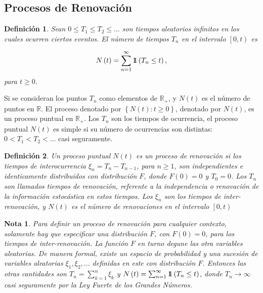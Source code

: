 \documentclass{article}
\newtheorem{Def}{Definición}
\newtheorem{Note}{Nota}
\newcommand{\rea}{\mathbb{R}}
\newcommand{\indora}{\mbox{$1$\hspace{-0.8ex}$1$}}
\begin{document}
\subsection{Procesos de Renovaci\'on}

\begin{Def}\label{Def.Tn}
Sean $0\leq T_{1}\leq T_{2}\leq \ldots$ son tiempos aleatorios infinitos en los cuales ocurren ciertos eventos. El n\'umero de tiempos $T_{n}$ en el intervalo $\left[0,t\right)$ es

\begin{eqnarray}
N\left(t\right)=\sum_{n=1}^{\infty}\indora\left(T_{n}\leq t\right),
\end{eqnarray}
para $t\geq0$.
\end{Def}

Si se consideran los puntos $T_{n}$ como elementos de $\rea_{+}$, y $N\left(t\right)$ es el n\'umero de puntos en $\rea$. El proceso denotado por $\left\{N\left(t\right):t\geq0\right\}$, denotado por $N\left(t\right)$, es un proceso puntual en $\rea_{+}$. Los $T_{n}$ son los tiempos de ocurrencia, el proceso puntual $N\left(t\right)$ es simple si su n\'umero de ocurrencias son distintas: $0<T_{1}<T_{2}<\ldots$ casi seguramente.

\begin{Def}
Un proceso puntual $N\left(t\right)$ es un proceso de renovaci\'on si los tiempos de interocurrencia $\xi_{n}=T_{n}-T_{n-1}$, para $n\geq1$, son independientes e identicamente distribuidos con distribuci\'on $F$, donde $F\left(0\right)=0$ y $T_{0}=0$. Los $T_{n}$ son llamados tiempos de renovaci\'on, referente a la independencia o renovaci\'on de la informaci\'on estoc\'astica en estos tiempos. Los $\xi_{n}$ son los tiempos de inter-renovaci\'on, y $N\left(t\right)$ es el n\'umero de renovaciones en el intervalo $\left[0,t\right)$
\end{Def}


\begin{Note}
Para definir un proceso de renovaci\'on para cualquier contexto, solamente hay que especificar una distribuci\'on $F$, con $F\left(0\right)=0$, para los tiempos de inter-renovaci\'on. La funci\'on $F$ en turno degune las otra variables aleatorias. De manera formal, existe un espacio de probabilidad y una sucesi\'on de variables aleatorias $\xi_{1},\xi_{2},\ldots$ definidas en este con distribuci\'on $F$. Entonces las otras cantidades son $T_{n}=\sum_{k=1}^{n}\xi_{k}$ y $N\left(t\right)=\sum_{n=1}^{\infty}\indora\left(T_{n}\leq t\right)$, donde $T_{n}\rightarrow\infty$ casi seguramente por la Ley Fuerte de los Grandes Números.
\end{Note}
\end{document}
